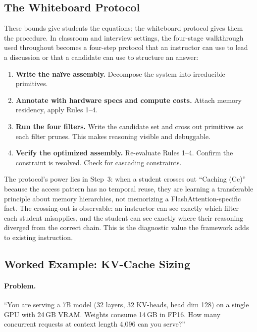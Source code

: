 \documentclass[10pt,twocolumn]{article}
\begin{document}
\subsection{The Whiteboard Protocol}
\label{sec:whiteboard}

These bounds give students the equations; the whiteboard protocol gives them the procedure. In classroom and interview settings, the four-stage walkthrough used throughout  becomes a four-step protocol that an instructor can use to lead a discussion or that a candidate can use to structure an answer:

\begin{enumerate}[nosep, leftmargin=*]
\item \textbf{Write the na\"ive assembly.} Decompose the system into irreducible primitives.

\item \textbf{Annotate with hardware specs and compute costs.} Attach memory residency, apply Rules 1--4.

\item \textbf{Run the four filters.} Write the candidate set and cross out primitives as each filter prunes. This makes reasoning visible and debuggable.

\item \textbf{Verify the optimized assembly.} Re-evaluate Rules 1--4. Confirm the constraint is resolved. Check for cascading constraints.
\end{enumerate}

The protocol's power lies in Step~3: when a student crosses out ``Caching (Cc)'' because the access pattern has no temporal reuse, they are learning a transferable principle about memory hierarchies, not memorizing a FlashAttention-specific fact. The crossing-out is observable: an instructor can see exactly which filter each student misapplies, and the student can see exactly where their reasoning diverged from the correct chain. This is the diagnostic value the framework adds to existing instruction.


\subsection{Worked Example: KV-Cache Sizing}
\label{sec:kv-sizing}

\paragraph{Problem.} ``You are serving a 7B model (32 layers, 32 KV-heads, head dim 128) on a single GPU with 24\,GB VRAM. Weights consume 14\,GB in FP16. How many concurrent requests at context length 4,096 can you serve?''
\end{document}
